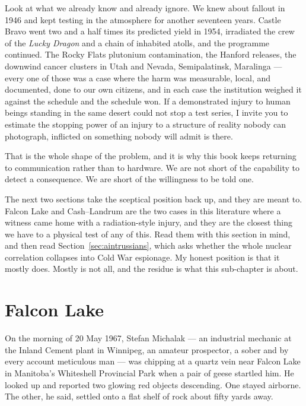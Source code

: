 Look at what we already know and already ignore. We knew about fallout in 1946 and kept testing in
the atmosphere for another seventeen years. Castle Bravo went two and a half times its predicted
yield in 1954, irradiated the crew of the \emph{Lucky Dragon} and a chain of inhabited atolls, and
the programme continued. The Rocky Flats plutonium contamination, the Hanford releases, the downwind
cancer clusters in Utah and Nevada, Semipalatinsk, Maralinga --- every one of those was a case where
the harm was measurable, local, and documented, done to our own citizens, and in each case the
institution weighed it against the schedule and the schedule won. If a demonstrated injury to human
beings standing in the same desert could not stop a test series, I invite you to estimate the
stopping power of an injury to a structure of reality nobody can photograph, inflicted on something
nobody will admit is there.

That is the whole shape of the problem, and it is why this book keeps returning to communication
rather than to hardware. We are not short of the capability to detect a consequence. We are short of
the willingness to be told one. 

The next two sections take the sceptical position back up, and they are meant to. Falcon Lake and
Cash--Landrum are the two cases in this literature where a witness came home with a radiation-style
injury, and they are the closest thing we have to a physical test of any of this. Read them with this
section in mind, and then read Section~\ref{sec:aintrussians}, which asks whether the whole nuclear
correlation collapses into Cold War espionage. My honest position is that it mostly does. Mostly is
not all, and the residue is what this sub-chapter is about.

\Needspace*{0.40\textheight}
\section{Falcon Lake}\label{sec:falconlake}

On the morning of 20 May 1967, Stefan Michalak --- an industrial mechanic at the Inland Cement
plant in Winnipeg, an amateur prospector, a sober and by every account meticulous man --- was
chipping at a quartz vein near Falcon Lake in Manitoba's Whiteshell Provincial Park when a pair of
geese startled him. He looked up and reported two glowing red objects descending. One stayed
airborne. The other, he said, settled onto a flat shelf of rock about fifty yards away.

